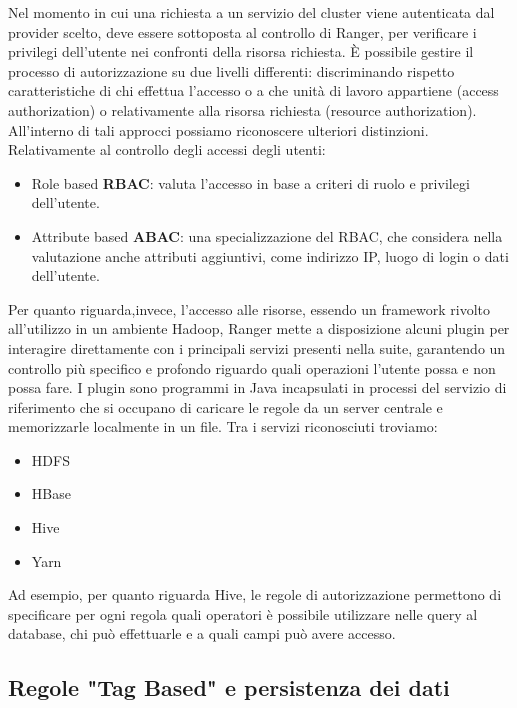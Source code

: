 Nel momento in cui una richiesta a un servizio del cluster viene autenticata dal provider scelto, deve essere sottoposta al controllo di Ranger, per verificare i privilegi dell'utente nei confronti della risorsa richiesta. È possibile gestire il processo di autorizzazione su due livelli differenti: discriminando rispetto caratteristiche di chi effettua l'accesso o a che unità di lavoro appartiene (access authorization) o relativamente alla risorsa richiesta (resource authorization).
\newline 
All'interno di tali approcci possiamo riconoscere ulteriori distinzioni. Relativamente al controllo degli accessi degli utenti:
\begin{itemize}
	\item Role based \textbf{RBAC}: valuta l'accesso in base a criteri di ruolo e privilegi dell'utente.
	\item Attribute based \textbf{ABAC}: una specializzazione del RBAC, che considera nella valutazione anche attributi aggiuntivi, come indirizzo IP, luogo di login o dati dell'utente.
\end{itemize}
Per quanto riguarda,invece, l'accesso alle risorse, essendo un framework rivolto all'utilizzo in un ambiente Hadoop, Ranger mette a disposizione alcuni plugin per interagire direttamente con i principali servizi presenti nella suite, garantendo un controllo più specifico e profondo riguardo quali operazioni l'utente possa e non possa fare. I plugin sono programmi in Java incapsulati in processi del servizio di riferimento che si occupano di caricare le regole da un server centrale e memorizzarle localmente in un file. Tra i servizi riconosciuti troviamo:
\begin{itemize}
	\item HDFS
	\item HBase
	\item Hive
	\item Yarn
\end{itemize}
Ad esempio, per quanto riguarda Hive, le regole di autorizzazione permettono di specificare per ogni regola quali operatori è possibile utilizzare nelle query al database, chi può effettuarle e a quali campi può avere accesso.

\subsection{Regole "Tag Based" e persistenza dei dati}

